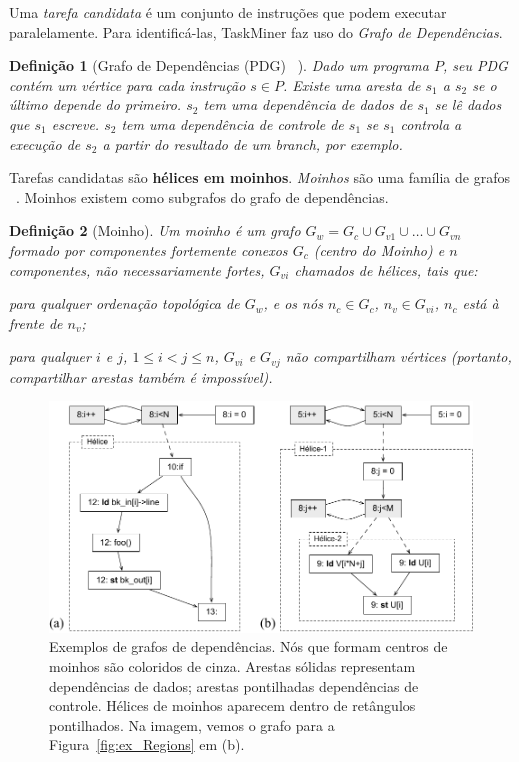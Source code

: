 \documentclass[sigconf]{acmart}
\newcommand\Taskminer{\mbox{\textsf{TaskMiner}}}
\newtheorem{Definicao}{Defini\c{c}\~{a}o}
\begin{document}
Uma {\em tarefa candidata} é um conjunto de instruções que podem executar paralelamente.
Para identificá-las, {\Taskminer} faz uso do {\em Grafo de Dependências}. 

\begin{Definicao} [Grafo de Dependências (PDG) ~\cite{Ferrante87}]
\label{def:pdg}
Dado um programa
$P$, seu PDG contém um vértice para cada instrução $s \in P$. Existe uma aresta de 
$s_1$ a $s_2$ se o último depende do primeiro. $s_2$ tem uma dependência de dados de $s_1$
se lê dados que $s_1$ escreve. $s_2$ tem uma dependência de controle de $s_1$ se $s_1$ controla
a execução de $s_2$ a partir do resultado de um \textit{branch}, por exemplo.
\end{Definicao}

Tarefas candidatas são \textbf{hélices em moinhos}. {\em Moinhos} são uma família de grafos ~\cite{Rideau08}.
Moinhos existem como subgrafos do grafo de dependências. 

\begin{Definicao} [Moinho]
\label{def:moinho}
Um moinho é um grafo $G_w = G_c \cup G_{v1} \cup \ldots \cup G_{vn}$
formado por componentes fortemente conexos $G_c$ (centro do Moinho) e $n$ componentes, não necessariamente
fortes, $G_{vi}$ chamados de hélices, tais que:
\begin{compactenum}
\item para qualquer ordenação topológica de $G_w$, e os nós $n_c \in G_c$,
$n_v \in G_{vi}$, $n_c$ está à frente de $n_v$;
\item para qualquer $i$ e $j$, $1 \leq i < j \leq n$, $G_{vi}$ e $G_{vj}$ não
compartilham vértices (portanto, compartilhar arestas também é impossível).
\end{compactenum}
\end{Definicao}

\begin{figure}[h]
\begin{center}
\includegraphics[width=1\columnwidth]{images/ex_windmill}
\caption{Exemplos de grafos de dependências. Nós que formam centros de moinhos
são coloridos de cinza. Arestas sólidas representam dependências de dados; arestas pontilhadas
dependências de controle. Hélices de moinhos aparecem dentro de retângulos pontilhados.
Na imagem, vemos o grafo para a Figura~\ref{fig:ex_Regions} em (b).}
\label{fig:ex_windmill}
\end{center}
\end{figure}
\end{document}
